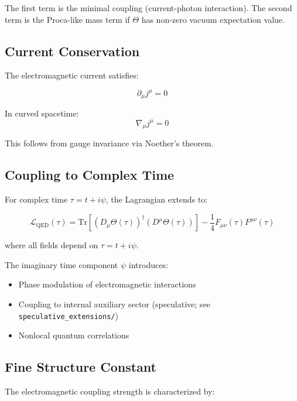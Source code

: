 The first term is the minimal coupling (current-photon interaction). The second term is the Proca-like mass term if $\Theta$ has non-zero vacuum expectation value.

\subsection{Current Conservation}

The electromagnetic current satisfies:

\begin{equation}
\label{eq:canonical:current_conservation}
\partial_\mu j^\mu = 0
\end{equation}

In curved spacetime:
\begin{equation}
\nabla_\mu j^\mu = 0
\end{equation}

This follows from gauge invariance via Noether's theorem.

\subsection{Coupling to Complex Time}

For complex time $\tau = t + i\psi$, the Lagrangian extends to:

\begin{equation}
\label{eq:canonical:qed_complex_time}
\mathcal{L}_{\text{QED}}(\tau) = \text{Tr}\left[(D_\mu\Theta(\tau))^\dagger (D^\mu\Theta(\tau))\right] - \frac{1}{4} F_{\mu\nu}(\tau) F^{\mu\nu}(\tau)
\end{equation}

where all fields depend on $\tau = t + i\psi$.

The imaginary time component $\psi$ introduces:
\begin{itemize}
    \item Phase modulation of electromagnetic interactions
    \item Coupling to internal auxiliary sector (speculative; see \texttt{speculative\_extensions/})
    \item Nonlocal quantum correlations
\end{itemize}

\subsection{Fine Structure Constant}

The electromagnetic coupling strength is characterized by:

